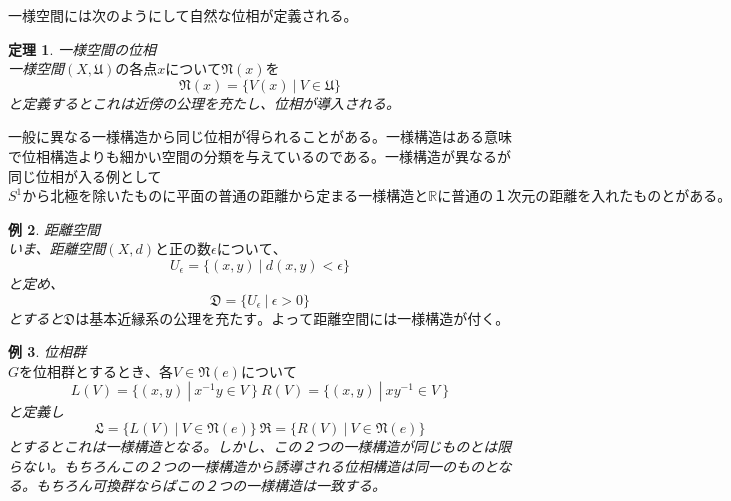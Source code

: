 \documentclass[leqno]{jsarticle}
\newtheorem{thm}{定理}
\newtheorem{exam}[thm]{例}
\begin{document}
一様空間には次のようにして自然な位相が定義される。
\begin{thm}一様空間の位相\\
一様空間$(X,\mathfrak{U})の各点xについて\mathfrak{N}(x)を$
\[
\mathfrak{N}(x)=\{V(x)\ |\ V\in \mathfrak{U} \}
\]と定義するとこれは近傍の公理を充たし、位相が導入される。
\end{thm}
一般に異なる一様構造から同じ位相が得られることがある。一様構造はある意味で位相構造よりも細かい空間の分類を与えているのである。一様構造が異なるが同じ位相が入る例として$S^1から北極を除いたものに平面の普通の距離から定まる一様構造と\mathbb{R}に普通の１次元の距離を入れたものとがある。$
\begin{exam}距離空間\\
いま、距離空間$(X,d)と正の数\epsilon　について、$
\[
U_{\epsilon}=\{(x,y)\ |\ d(x,y)<\epsilon \}
\]と定め、
\[
\mathfrak{D}=\{U_{\epsilon}\ |\ \epsilon>0\}
\]とすると$\mathfrak{D}は基本近縁系の公理を充たす。よって距離空間には一様構造が付く。$
\end{exam}
\begin{exam}位相群\\
$Gを位相群とするとき、各V\in \mathfrak{N}(e)について$
\[
L(V)=\{(x,y)\ |\ x^{-1}y\in V\ \}\ R(V)=\{(x,y)\ |\ xy^{-1}\in V\  \}
\]と定義し
\[
\mathfrak{L}=\{L(V)\ |\ V\in \mathfrak{N}(e)\}\ \mathfrak{R}=\{R(V)\ | \ V\in \mathfrak{N}(e)\}
\]とするとこれは一様構造となる。しかし、この２つの一様構造が同じものとは限らない。もちろんこの２つの一様構造から誘導される位相構造は同一のものとなる。もちろん可換群ならばこの２つの一様構造は一致する。
\end{exam}
\end{document}

